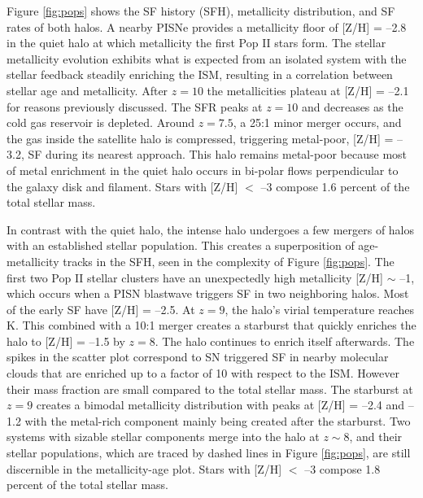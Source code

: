 \documentclass[12pt,preprint]{aastex}
\begin{document}


Figure \ref{fig:pops} shows the SF history (SFH), metallicity
distribution, and SF rates of both halos.  A nearby PISNe provides a
metallicity floor of [Z/H] = --2.8 in the quiet halo at which
metallicity the first Pop II stars form.  The stellar metallicity
evolution exhibits what is expected from an isolated system with the
stellar feedback steadily enriching the ISM, resulting in a
correlation between stellar age and metallicity.  After $z=10$ the
metallicities plateau at [Z/H] = --2.1 for reasons previously
discussed.  The SFR peaks at $z=10$ and decreases as the cold gas
reservoir is depleted.  Around $z=7.5$, a 25:1 minor merger occurs,
and the gas inside the satellite halo is compressed, triggering
metal-poor, [Z/H] = --3.2, SF during its nearest approach.  This halo
remains metal-poor because most of metal enrichment in the quiet halo
occurs in bi-polar flows perpendicular to the galaxy disk and
filament.  Stars with [Z/H] $<$ --3 compose 1.6 percent of the total
stellar mass.
       
In contrast with the quiet halo, the intense halo undergoes a few
mergers of halos with an established stellar population.  This creates
a superposition of age-metallicity tracks in the SFH, seen in the
complexity of Figure \ref{fig:pops}.  The first two Pop II stellar
clusters have an unexpectedly high metallicity [Z/H] $\sim$ --1, which
occurs when a PISN blastwave triggers SF in two neighboring halos.
Most of the early SF have [Z/H] = --2.5.  At $z=9$, the halo's virial
temperature reaches  K.  This combined with a 10:1 merger
creates a starburst that quickly enriches the halo to [Z/H] = --1.5 by
$z=8$.  The halo continues to enrich itself afterwards.  The spikes in
the scatter plot correspond to SN triggered SF in nearby molecular
clouds that are enriched up to a factor of 10 with respect to the ISM.
However their mass fraction are small compared to the total stellar
mass.  The starburst at $z=9$ creates a bimodal metallicity
distribution with peaks at [Z/H] = --2.4 and --1.2 with the metal-rich
component mainly being created after the starburst.  Two systems with
sizable stellar components merge into the halo at $z \sim 8$, and
their stellar populations, which are traced by dashed lines in Figure
\ref{fig:pops}, are still discernible in the metallicity-age plot.
Stars with [Z/H] $<$ --3 compose 1.8 percent of the total stellar
mass.
\end{document}
